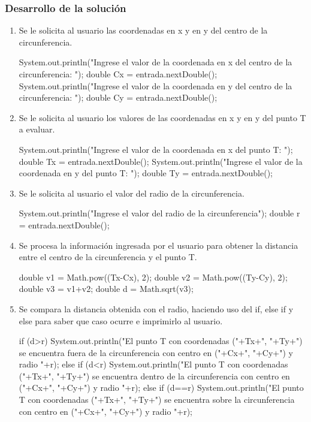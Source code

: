 \subsubsection{Desarrollo de la solución}
\begin{enumerate}
    \item Se le solicita al usuario las coordenadas en x y en y del centro de la circunferencia.
    \begin{javaCode}
        System.out.println("Ingrese el valor de la coordenada en x del centro de la circunferencia: ");
        double Cx = entrada.nextDouble();
        System.out.println("Ingrese el valor de la coordenada en y del centro de la circunferencia: ");
        double Cy = entrada.nextDouble();
    \end{javaCode}
    \item Se le solicita al usuario los valores de las coordenadas en x y en y del punto T a evaluar.
    \begin{javaCode}
        System.out.println("Ingrese el valor de la coordenada en x del punto T: ");
        double Tx = entrada.nextDouble();
        System.out.println("Ingrese el valor de la coordenada en y del punto T: ");
        double Ty = entrada.nextDouble();
    \end{javaCode}
    \item Se le solicita al usuario el valor del radio de la circunferencia.
    \begin{javaCode}
        System.out.println("Ingrese el valor del radio de la circunferencia");
        double r = entrada.nextDouble();
    \end{javaCode}
    \item Se procesa la información ingresada por el usuario para obtener la distancia entre el centro de la circunferencia y el punto T.
    \begin{javaCode}
        double v1 = Math.pow((Tx-Cx), 2);
        double v2 = Math.pow((Ty-Cy), 2);
        double v3 = v1+v2;
        double d = Math.sqrt(v3);
    \end{javaCode}
    \item Se compara la distancia obtenida con el radio, haciendo uso del if, else if y else para saber que caso ocurre e imprimirlo al usuario.
    \begin{javaCode}
        if (d>r){
            System.out.println("El punto T con coordenadas ("+Tx+", "+Ty+") se encuentra fuera de la circunferencia con centro en ("+Cx+", "+Cy+") y radio "+r);
        }else if (d<r){
            System.out.println("El punto T con coordenadas ("+Tx+", "+Ty+") se encuentra dentro de la circunferencia con centro en ("+Cx+", "+Cy+") y radio "+r);
        }else if (d==r){
            System.out.println("El punto T con coordenadas ("+Tx+", "+Ty+") se encuentra sobre la circunferencia con centro en ("+Cx+", "+Cy+") y radio "+r);
        }
    \end{javaCode}
\end{enumerate}

